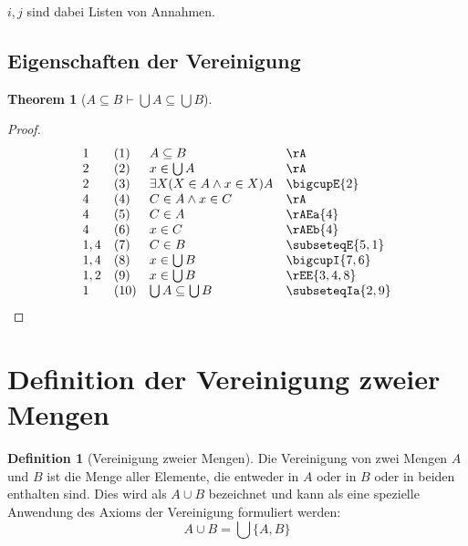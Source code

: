 \documentclass{book}
\theoremstyle{plain}
\newtheorem{theorem}{Theorem}
\theoremstyle{remark}
\theoremstyle{definition}
\newtheorem{definition}{Definition}[section]
\begin{document}
\(i,j\) sind dabei Listen von Annahmen.

\subsection{Eigenschaften der Vereinigung}

\label{ASubseteqBImpBigcupASubseteqBigcupB}
\begin{theorem}[\(A \subseteq B \vdash \bigcup A \subseteq \bigcup B\)]
\end{theorem}
\begin{proof}
	\[
	\begin{array}{llll}
		1 & (1) & A \subseteq B & \rA \\
		2 & (2) & x\in\bigcup A & \rA \\
		2 & (3) & \exists X(X\in A\land x\in X)A & \bigcupE{2} \\
		4 & (4) & C\in A\land x\in C & \rA \\
		4 & (5) & C\in A & \rAEa{4} \\
		4 & (6) & x\in C & \rAEb{4} \\
		1,4 & (7) & C\in B & \subseteqE{5,1} \\
		1,4 & (8) & x\in\bigcup B & \bigcupI{7,6} \\
		1,2 & (9) & x\in\bigcup B & \rEE{3,4,8} \\
		1 & (10) & \bigcup A\subseteq \bigcup B & \subseteqIa{2,9} \\
	\end{array}
	\]
\end{proof}

\label{AcuBEqualsBigcupLbAwBRb}
\section{Definition der Vereinigung zweier Mengen}
\begin{definition}[Vereinigung zweier Mengen]
	Die Vereinigung von zwei Mengen \( A \) und \( B \) ist die Menge aller Elemente, die entweder in \( A \) oder in \( B \) oder in beiden enthalten sind. Dies wird als \( A \cup B \) bezeichnet und kann als eine spezielle Anwendung des Axioms der Vereinigung formuliert werden:
	\[
	A \cup B = \bigcup \{ A, B \}
	\]
\end{definition}
\end{document}
